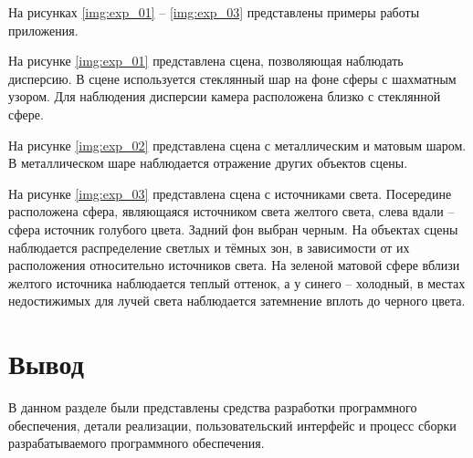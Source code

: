         На рисунках \ref{img:exp_01} -- \ref{img:exp_03} представлены примеры работы приложения.
        
        На рисунке \ref{img:exp_01} представлена сцена, позволяющая наблюдать дисперсию. В сцене используется стеклянный шар на фоне сферы с шахматным узором. Для наблюдения дисперсии камера расположена близко с стеклянной сфере.
        
        
        На рисунке \ref{img:exp_02} представлена сцена с металлическим и матовым шаром. В металлическом шаре наблюдается отражение других объектов сцены.
        
        
        На рисунке \ref{img:exp_03} представлена сцена с источниками света. Посередине расположена сфера, являющаяся источником света желтого света, слева вдали -- сфера источник голубого цвета. Задний фон выбран черным. На объектах сцены наблюдается распределение светлых и тёмных зон, в зависимости от их расположения относительно источников света. На зеленой матовой сфере вблизи желтого источника наблюдается теплый оттенок, а у синего -- холодный, в местах недостижимых для лучей света наблюдается затемнение вплоть до черного цвета.
        
    
    \clearpage
    
    \section{Вывод}

        В данном разделе были представлены средства разработки программного обеспечения, детали реализации, пользовательский интерфейс и процесс сборки разрабатываемого программного обеспечения.